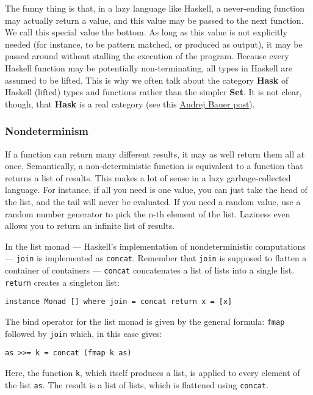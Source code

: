 The funny thing is that, in a lazy language like Haskell, a never-ending
function may actually return a value, and this value may be passed to
the next function. We call this special value the bottom. As long as
this value is not explicitly needed (for instance, to be pattern
matched, or produced as output), it may be passed around without
stalling the execution of the program. Because every Haskell function
may be potentially non-terminating, all types in Haskell are assumed to
be lifted. This is why we often talk about the category \textbf{Hask} of
Haskell (lifted) types and functions rather than the simpler
\textbf{Set}. It is not clear, though, that \textbf{Hask} is a real
category (see this
\href{http://math.andrej.com/2016/08/06/hask-is-not-a-category/}{Andrej
Bauer post}).

\subsubsection{Nondeterminism}\label{nondeterminism}

If a function can return many different results, it may as well return
them all at once. Semantically, a non-deterministic function is
equivalent to a function that returns a list of results. This makes a
lot of sense in a lazy garbage-collected language. For instance, if all
you need is one value, you can just take the head of the list, and the
tail will never be evaluated. If you need a random value, use a random
number generator to pick the n-th element of the list. Laziness even
allows you to return an infinite list of results.

In the list monad --- Haskell's implementation of nondeterministic
computations --- \texttt{join} is implemented as \texttt{concat}.
Remember that \texttt{join} is supposed to flatten a container of
containers --- \texttt{concat} concatenates a list of lists into a
single list. \texttt{return} creates a singleton list:

\begin{verbatim}
instance Monad [] where join = concat return x = [x]
\end{verbatim}

The bind operator for the list monad is given by the general formula:
\texttt{fmap} followed by \texttt{join} which, in this case gives:

\begin{verbatim}
as >>= k = concat (fmap k as)
\end{verbatim}

Here, the function \texttt{k}, which itself produces a list, is applied
to every element of the list \texttt{as}. The result is a list of lists,
which is flattened using \texttt{concat}.

